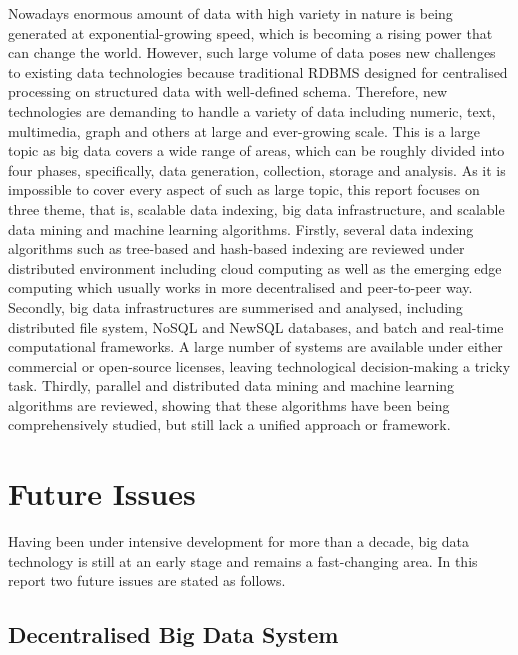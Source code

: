 \documentclass[conference]{IEEEtran}
\begin{document}
Nowadays enormous amount of data with high variety in nature is being
generated at exponential-growing speed, which is becoming a rising power
that can change the world. However, such large volume of data poses new
challenges to existing data technologies because traditional RDBMS
designed for centralised processing on structured data with well-defined
schema. Therefore, new technologies are demanding to handle a variety of
data including numeric, text, multimedia, graph and others at large and
ever-growing scale. This is a large topic as big data covers a wide
range of areas, which can be roughly divided into four phases,
specifically, data generation, collection, storage and analysis. As it
is impossible to cover every aspect of such as large topic, this report
focuses on three theme, that is, scalable data indexing, big data
infrastructure, and scalable data mining and machine learning
algorithms. Firstly, several data indexing algorithms such as tree-based
and hash-based indexing are reviewed under distributed environment
including cloud computing as well as the emerging edge computing which
usually works in more decentralised and peer-to-peer way. Secondly, big
data infrastructures are summerised and analysed, including distributed
file system, NoSQL and NewSQL databases, and batch and real-time
computational frameworks. A large number of systems are available under
either commercial or open-source licenses, leaving technological
decision-making a tricky task. Thirdly, parallel and distributed data
mining and machine learning algorithms are reviewed, showing that these
algorithms have been being comprehensively studied, but still lack a
unified approach or framework.

\hypertarget{future-issues}{%
\section{Future Issues}\label{future-issues}}

Having been under intensive development for more than a decade, big data
technology is still at an early stage and remains a fast-changing area.
In this report two future issues are stated as follows.

\hypertarget{decentralised-big-data-system}{%
\subsection{Decentralised Big Data
System}\label{decentralised-big-data-system}}
\end{document}
